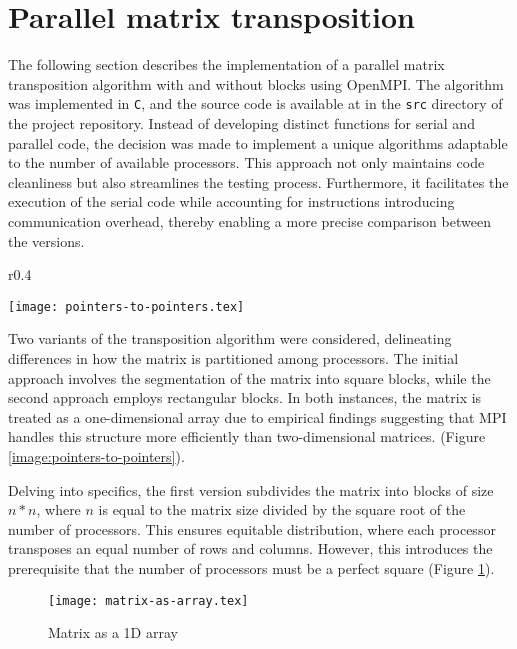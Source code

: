 \section*{\label{sec:transposition}Parallel matrix transposition}

The following section describes the implementation of a parallel matrix transposition algorithm with and %
without blocks using OpenMPI. The algorithm was implemented in \texttt{C}, and the source code is available at %
in the \texttt{src} directory of the project repository.
Instead of developing distinct functions for serial and parallel code, the decision was made to implement %
a unique algorithms adaptable to the number of available processors. This approach not only maintains code %
cleanliness but also streamlines the testing process. Furthermore, it facilitates the execution of the serial %
code while accounting for instructions introducing communication overhead, thereby enabling a more precise %
comparison between the versions.

\setlength{\abovecaptionskip}{-5pt} %
\begin{wrapfigure}{r}{0.4\textwidth}
    \caption{\label{image:pointers-to-pointers}Array of pointers to arrays}
    \centering
    \texttt{[image: pointers-to-pointers.tex]}
\end{wrapfigure}

Two variants of the transposition algorithm were considered, delineating differences in how the matrix is %
partitioned among processors. The initial approach involves the segmentation of the matrix into square blocks, %
while the second approach employs rectangular blocks. In both instances, the matrix is treated as a one-dimensional %
array due to empirical findings suggesting that MPI handles this structure more efficiently than two-dimensional matrices. %
(Figure \ref{image:pointers-to-pointers}). %

Delving into specifics, the first version subdivides the matrix into blocks of size $n * n$, where $n$ is equal %
to the matrix size divided by the square root of the number of processors. This ensures equitable distribution, %
where each processor transposes an equal number of rows and columns. However, this introduces the prerequisite %
that the number of processors must be a perfect square (Figure \ref{image:matrix-as-array}).

\begin{figure}[h]
    \caption{\label{image:matrix-as-array}Matrix as a 1D array}
    \centering
    \texttt{[image: matrix-as-array.tex]}
\end{figure}

